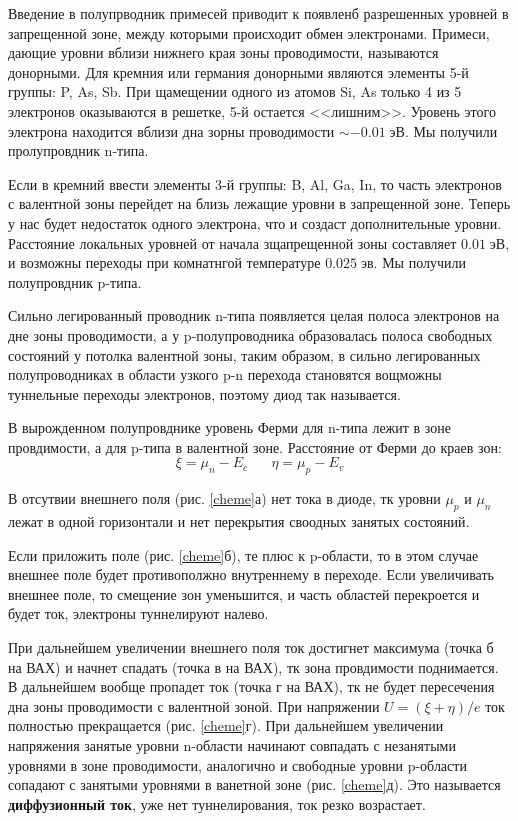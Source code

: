 \documentclass[a4paper]{article}
\begin{document}
Введение в полупрводник примесей приводит к появленб разрешенных уровней в запрещенной зоне, между которыми происходит обмен электронами. 
Примеси, дающие уровни вблизи нижнего края зоны проводимости, называются донорными. Для кремния или германия донорными являются элементы 5-й группы: P, As, Sb.
При щамещении одного из атомов Si, As только 4 из 5 электронов оказываются в решетке, 5-й остается <<лишним>>. Уровень этого электрона находится вблизи дна зорны проводимости $\sim -0.01\; эВ$. 
Мы получили пролупровдник n-типа. \par 

Если в кремний ввести элементы 3-й группы: B, Al, Ga, In, то часть электронов с валентной зоны перейдет на близь лежащие уровни в запрещенной зоне. Теперь у нас будет недостаток одного электрона, что и создаст дополнительные уровни. 
Расстояние локальных уровней от начала зщапрещенной зоны составляет $0.01\;  эВ$, и возможны переходы при комнатнгой температуре $0.025\; эв$. Мы получили полупровдник p-типа. \par 

Сильно легированный проводник n-типа появляется целая полоса электронов на дне зоны проводимости, а у p-полупроводника образовалась полоса свободных состояний у потолка валентной зоны, таким образом, 
в сильно легированных полупроводниках в области узкого p-n перехода становятся вощможны туннельные переходы электронов, поэтому диод так называется. \par 

В вырожденном полупровднике уровень Ферми для n-типа лежит в зоне провдимости, а для p-типа в валентной зоне. Расстояние от Ферми до краев зон: 
$$\xi = \mu_n - E_c \;\;\;\;\;\; \eta = \mu_p - E_v$$

В отсутвии внешнего поля (рис. \ref{cheme}а) нет тока в диоде, тк уровни $\mu_p$ и $\mu_n$ лежат в одной горизонтали и нет перекрытия своодных занятых состояний. \par 

Если приложить поле (рис. \ref{cheme}б), те плюс к p-области, то в этом случае внешнее поле будет противополжно внутреннему в переходе. Если увеличивать внешнее поле, то смещение зон уменьшится, и часть областей перекроется и будет ток, электроны туннелируют налево. \par 

При дальнейшем увеличении внешнего поля ток достигнет максимума (точка б на ВАХ) и начнет спадать (точка в на ВАХ), тк зона провдимости поднимается. В дальнейшем вообще пропадет ток (точка г на ВАХ), тк не будет пересечения дна зоны проводимости с валентной зоной. При напряжении 
$U = (\xi + \eta)/e$ ток полностью прекращается (рис. \ref{cheme}г). При дальнейшем увеличении напряжения занятые уровни n-области начинают совпадать с незанятыми уровнями в зоне проводимости, аналогично и свободные уровни p-области сопадают с занятыми уровнями в ванетной зоне (рис. \ref{cheme}д). 
Это называется \textbf{диффузионный ток}, уже нет туннелирования, ток резко возрастает. \par 
\end{document}
